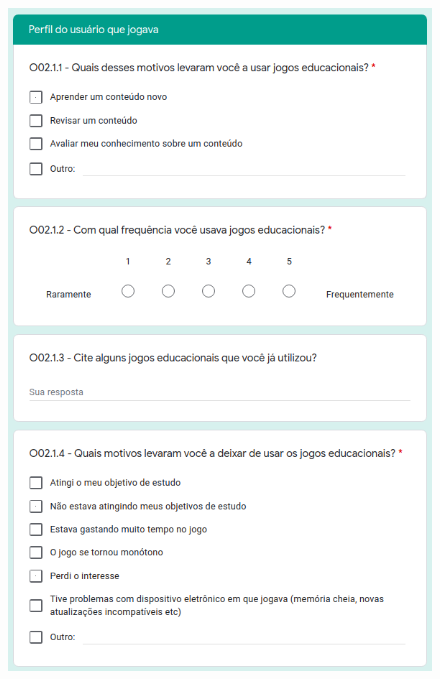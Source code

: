 \begin{apendicesenv}
\begin{figure}[htbp]
{        \includegraphics[keepaspectratio=true,scale=1.25]{figuras/apendice/survey6.png}
        \label{Fig:survey_pt6.png}
    }
    \quad
\end{figure}
\end{apendicesenv}
